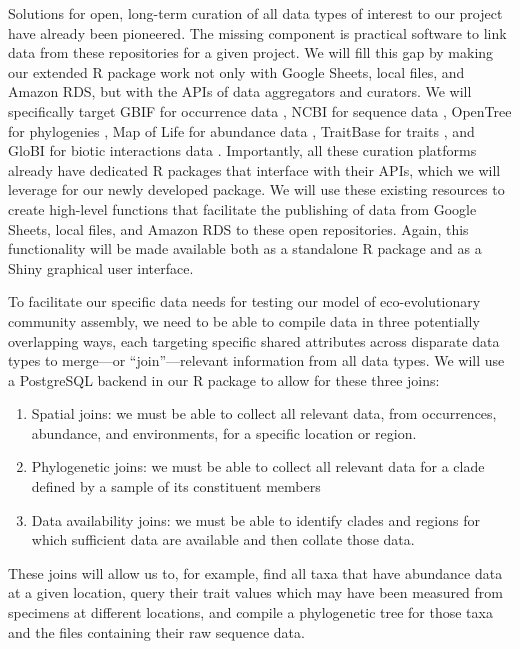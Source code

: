 \documentclass[11pt]{article}
\begin{document}
Solutions for open, long-term curation of all data types of interest to
our project have already been pioneered. The missing component is
practical software to link data from these repositories for a given
project. We will fill this gap by making our extended R package work not
only with Google Sheets, local files, and Amazon RDS, but with the APIs
of data aggregators and curators. We will specifically target GBIF for
occurrence data \cite{Flemons2007-eg}, NCBI for sequence data
\cite{Sherry2001-pn,Benson1993-jf}, OpenTree for phylogenies
\cite{Hinchliff2015-vi}, Map of Life for abundance data
\cite{Jetz2012-uq,Guralnick2017-xb}, TraitBase for traits
\cite{Bartomeus2018-zq}, and GloBI for biotic interactions data
\cite{Poelen2014-lg}. Importantly, all these curation platforms already
have dedicated R packages
\cite{Chamberlain2014-ds,Winter2017-ei,Michonneau2016-yc,Molina2017-hm,Poelen2018-vp}
that interface with their APIs, which we will leverage for our newly
developed package. We will use these existing resources to create
high-level functions that facilitate the publishing of data from Google
Sheets, local files, and Amazon RDS to these open repositories. Again,
this functionality will be made available both as a standalone R package
and as a Shiny graphical user interface.

To facilitate our specific data needs for testing our model of
eco-evolutionary community assembly, we need to be able to compile data
in three potentially overlapping ways, each targeting specific shared
attributes across disparate data types to merge---or ``join''---relevant
information from all data types. We will use a PostgreSQL
\cite{Douglas2003-zs} backend in our R package to allow for these three
joins:

\begin{enumerate}
\def\labelenumi{\arabic{enumi}.}
\item
  Spatial joins: we must be able to collect all relevant data, from
  occurrences, abundance, and environments, for a specific location or
  region.
\item
  Phylogenetic joins: we must be able to collect all relevant data for a
  clade defined by a sample of its constituent members
\item
  Data availability joins: we must be able to identify clades and
  regions for which sufficient data are available and then collate those
  data.
\end{enumerate}

These joins will allow us to, for example, find all taxa that have
abundance data at a given location, query their trait values which may
have been measured from specimens at different locations, and compile
a phylogenetic tree for those taxa and the files containing their raw
sequence data.
\end{document}
